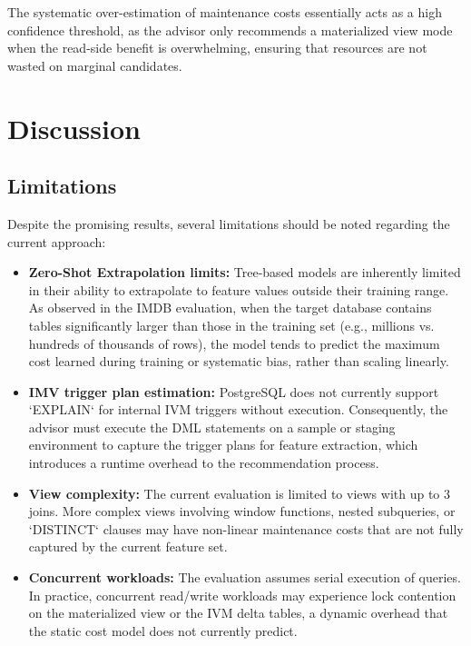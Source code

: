 The systematic over-estimation of maintenance costs essentially acts as a high confidence threshold, as the advisor only recommends a materialized view mode when the read-side benefit is overwhelming, ensuring that resources are not wasted on marginal candidates.

\section{Discussion}
\label{sec:discussion}

\subsection{Limitations}
\label{sec:limitations}

Despite the promising results, several limitations should be noted regarding the current approach:

\begin{itemize}
    \item \textbf{Zero-Shot Extrapolation limits:} Tree-based models are inherently limited in their ability to extrapolate to feature values outside their training range. As observed in the IMDB evaluation, when the target database contains tables significantly larger than those in the training set (e.g., millions vs. hundreds of thousands of rows), the model tends to predict the maximum cost learned during training or systematic bias, rather than scaling linearly.
    
    \item \textbf{\ac{IMV} trigger plan estimation:} PostgreSQL does not currently support `EXPLAIN` for internal \ac{IVM} triggers without execution. Consequently, the advisor must execute the \ac{DML} statements on a sample or staging environment to capture the trigger plans for feature extraction, which introduces a runtime overhead to the recommendation process.
    
    \item \textbf{View complexity:} The current evaluation is limited to views with up to 3 joins. More complex views involving window functions, nested subqueries, or `DISTINCT` clauses may have non-linear maintenance costs that are not fully captured by the current feature set.
    
    \item \textbf{Concurrent workloads:} The evaluation assumes serial execution of queries. In practice, concurrent read/write workloads may experience lock contention on the materialized view or the \ac{IVM} delta tables, a dynamic overhead that the static cost model does not currently predict.
\end{itemize}

